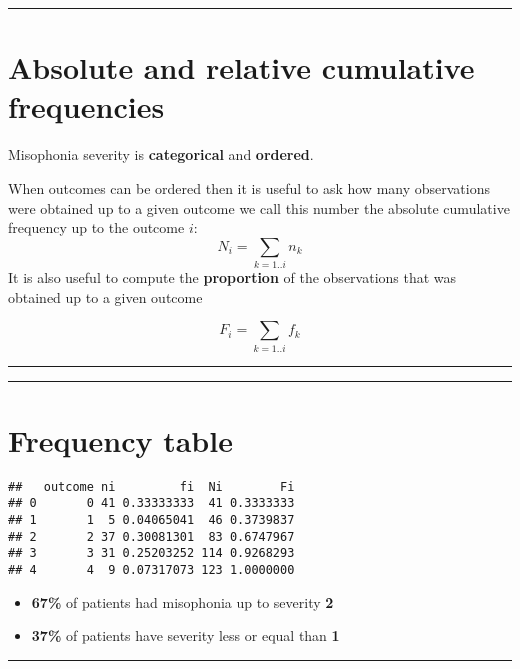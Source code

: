 \documentclass[
]{book}
\begin{document}
\begin{center}\rule{0.5\linewidth}{0.5pt}\end{center}

\hypertarget{absolute-and-relative-cumulative-frequencies}{%
\section{Absolute and relative cumulative frequencies}\label{absolute-and-relative-cumulative-frequencies}}

Misophonia severity is \textbf{categorical} and \textbf{ordered}.

When outcomes can be ordered then it is useful to ask how many observations were obtained up to a given outcome we call this number the absolute cumulative frequency up to the outcome \(i\):
\[N_i=\sum_{k=1..i} n_k\]
It is also useful to compute the \textbf{proportion} of the observations that was obtained up to a given outcome

\[F_i=\sum_{k=1..i} f_k\]

\begin{center}\rule{0.5\linewidth}{0.5pt}\end{center}

\begin{center}\rule{0.5\linewidth}{0.5pt}\end{center}

\hypertarget{frequency-table}{%
\section{Frequency table}\label{frequency-table}}

\begin{verbatim}
##   outcome ni         fi  Ni        Fi
## 0       0 41 0.33333333  41 0.3333333
## 1       1  5 0.04065041  46 0.3739837
## 2       2 37 0.30081301  83 0.6747967
## 3       3 31 0.25203252 114 0.9268293
## 4       4  9 0.07317073 123 1.0000000
\end{verbatim}

\begin{itemize}
\item
  \textbf{67\%} of patients had misophonia up to severity \textbf{2}
\item
  \textbf{37\%} of patients have severity less or equal than \textbf{1}
\end{itemize}

\begin{center}\rule{0.5\linewidth}{0.5pt}\end{center}
\end{document}
